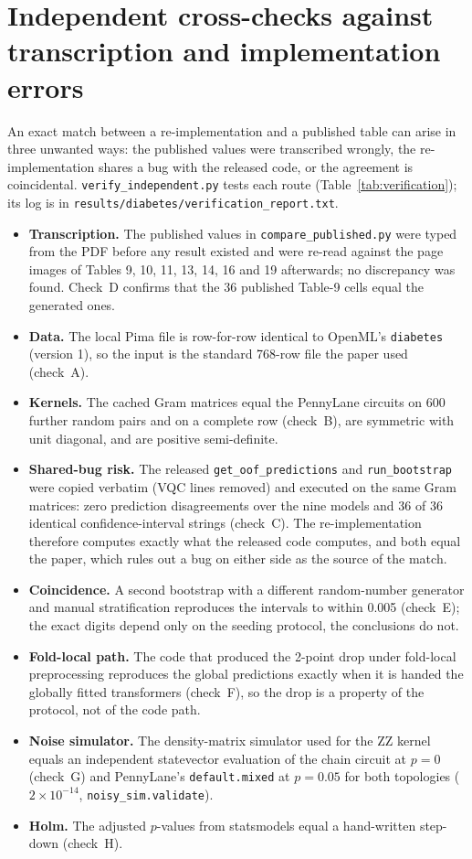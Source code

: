 \documentclass[11pt,a4paper]{article}
\newcommand{\code}[1]{\texttt{\small #1}}
\begin{document}
\section{Independent cross-checks against transcription and implementation errors}
\label{sec:verify}
An exact match between a re-implementation and a published table can arise in three unwanted ways: the published values were transcribed wrongly, the re-implementation shares a bug with the released code, or the agreement is coincidental. \code{verify\_independent.py} tests each route (Table~\ref{tab:verification}); its log is in \code{results/diabetes/verification\_report.txt}.
\begin{itemize}[nosep]
  \item \textbf{Transcription.} The published values in \code{compare\_published.py} were typed from the PDF before any result existed and were re-read against the page images of Tables 9, 10, 11, 13, 14, 16 and 19 afterwards; no discrepancy was found. Check~D confirms that the 36 published Table-9 cells equal the generated ones.
  \item \textbf{Data.} The local Pima file is row-for-row identical to OpenML's \code{diabetes} (version 1), so the input is the standard 768-row file the paper used (check~A).
  \item \textbf{Kernels.} The cached Gram matrices equal the PennyLane circuits on 600 further random pairs and on a complete row (check~B), are symmetric with unit diagonal, and are positive semi-definite.
  \item \textbf{Shared-bug risk.} The released \code{get\_oof\_predictions} and \code{run\_bootstrap} were copied verbatim (VQC lines removed) and executed on the same Gram matrices: zero prediction disagreements over the nine models and 36 of 36 identical confidence-interval strings (check~C). The re-implementation therefore computes exactly what the released code computes, and both equal the paper, which rules out a bug on either side as the source of the match.
  \item \textbf{Coincidence.} A second bootstrap with a different random-number generator and manual stratification reproduces the intervals to within 0.005 (check~E); the exact digits depend only on the seeding protocol, the conclusions do not.
  \item \textbf{Fold-local path.} The code that produced the 2-point drop under fold-local preprocessing reproduces the global predictions exactly when it is handed the globally fitted transformers (check~F), so the drop is a property of the protocol, not of the code path.
  \item \textbf{Noise simulator.} The density-matrix simulator used for the ZZ kernel equals an independent statevector evaluation of the chain circuit at $p=0$ (check~G) and PennyLane's \code{default.mixed} at $p=0.05$ for both topologies ($2\times10^{-14}$, \code{noisy\_sim.validate}).
  \item \textbf{Holm.} The adjusted $p$-values from statsmodels equal a hand-written step-down (check~H).
\end{itemize}
\end{document}
